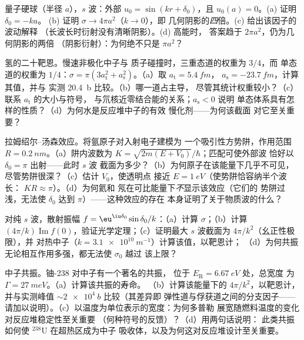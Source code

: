 \begin{exercise}[$\star\star$]\label{exo:b3:scattering-theory:6}
量子硬球（半径 $a$），$s$ 波：外部 $u_0 =
\sin(kr + \delta_0)$，且 $u_0(a) = 0$。(a) 证明 $\delta_0 = -ka$。
(b) 证明 $\sigma \to 4\pi a^2$（$k \to 0$），即
几何阴影的\emph{四}倍。(c) 给出该因子的波动解释
（长波长时衍射没有清晰阴影）。(d) 高能时，
答案趋于 $2\pi a^2$，仍为几何阴影的两倍
（阴影衍射）：为何绝不只是 $\pi a^2$？
\end{exercise}

\begin{exercise}[$\star\star$]\label{exo:b3:scattering-theory:7}
氢的二十靶恩。慢速非极化中子与
质子碰撞时，三重态道的权重为 $3/4$，而
单态道的权重为 $1/4$：$\sigma = \pi(3a_{\text{t}}^2 +
a_{\text{s}}^2)$。（a）取 $a_{\text{t}} = \qty{5.4}{fm}$，
$a_{\text{s}} = \qty{-23.7}{fm}$，计算其值，并与
实测 \qty{20.4}{b} 比较。（b）哪一道占主导，
尽管其统计权重较小？（c）联系 $a_{\text{t}}$ 的大小与符号，
与氘核近零结合能的关系；$a_{\text{s}} < 0$ 说明
单态体系具有怎样的性质？（d）为何水是反应堆中子的有效
慢化剂——为何该截面
对它至关重要？
\end{exercise}

\begin{exercise}[$\star\star$]\label{exo:b3:scattering-theory:8}
拉姆绍尔–汤森效应。将氩原子对入射电子建模为
一个吸引性方势阱，作用范围 $R =
\qty{0.2}{nm}$。（a）阱内波数为 $K =
\sqrt{2m(E + V_0)}/\hbar$；匹配可使外部波
恰好以 $\delta_0 = \pi$ 出射——此时 $s$ 波
截面为多少？（b）为何原子在该能量下几乎不可见，
尽管势阱很深？（c）估计 $V_0$，使透明点
接近 $E = \qty{1}{eV}$（使势阱恰容纳半个波长：
$KR \approx \pi$）。（d）为何氦和
氖在可比能量下\emph{不}显示该效应（它们的
势阱过浅，无法使 $\delta_0$ 达到 $\pi$）——这种效应的存在
本身证明了关于物质波的什么？
\end{exercise}

\begin{exercise}[$\star\star$]\label{exo:b3:scattering-theory:9}
对纯 $s$ 波，散射振幅 $f = \eu^{\iu\delta_0}\sin\delta_0/
k$：（a）计算 $\sigma$；（b）计算 $(4\pi/k)\operatorname{Im}
f(0)$，验证光学定理；（c）证明最大
$s$ 波截面为 $4\pi/k^2$（幺正性极限），并
对热中子（$k = \qty{3.1e10}{m^{-1}}$）计算该值，以靶恩计；
（d）为何共振无论相互作用多强，都无法使 $\sigma_0$ 越过
该上限？
\end{exercise}

\begin{exercise}[$\star\star\star$]\label{exo:b3:scattering-theory:10}
中子共振。铀-238 对中子有一个著名的共振，
位于 $E_{\text{R}} = \qty{6.67}{eV}$ 处，总宽度
为 $\Gamma = \qty{27}{meV}$。（a）计算该共振的寿命。
（b）计算该能量下的 $4\pi/k^2$，以靶恩计，
并与实测峰值 $\sim\qty{2e4}{b}$ 比较（其差异即
弹性道与俘获道之间的分支因子——
请加以说明）。（c）以温度为单位表示的宽度：为何多普勒
展宽随燃料温度的变化对反应堆稳定性至关重要
（何种符号的反馈）？（d）用两句话说明：
此类共振如何使 $^{238}$U 在超热区成为中子
吸收体，以及为何这对反应堆设计至关重要。
\end{exercise}

